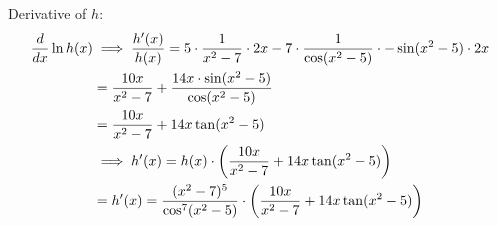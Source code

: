 \documentclass[nooutcomes]{ximera}
\begin{document}
\begin{problem}
\begin{enumerate}
\begin{freeResponse}
            Derivative of $h$:
            \begin{align*}
              \frac{d}{dx} \ln h(x) &\implies \frac{h'(x)}{h(x)} = 5 \cdot \frac{1}{x^2 - 7} \cdot 2x - 7 \cdot\frac{1}{\cos(x^2 - 5)} \cdot - \sin(x^2-5) \cdot 2x\\
                            &= \frac{10x}{x^2-7} + \frac{14x \cdot \sin(x^2 - 5)}{\cos(x^2 - 5)}\\
              &= \frac{10x}{x^2-7} + 14x \tan(x^2-5) \\
              &\implies h'(x) = h(x)\cdot \left( \frac{10x}{x^2-7} + 14x \tan(x^2-5) \right) \\
              &= h'(x) = \frac{(x^2 - 7)^5}{\cos^7(x^2 - 5)} \cdot \left( \frac{10x}{x^2-7} + 14x \tan(x^2-5) \right)
            \end{align*}
	\end{freeResponse}
	\end{enumerate}
\end{problem}
\end{document}

